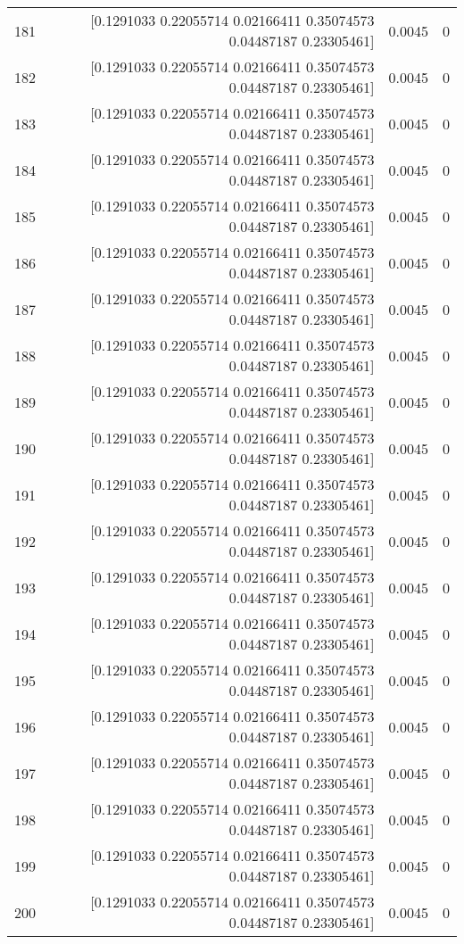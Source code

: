 \begin{longtable}{lrrr}
181 & [0.1291033  0.22055714 0.02166411 0.35074573 0.04487187 0.23305461] & 0.0045 & 0 \\
182 & [0.1291033  0.22055714 0.02166411 0.35074573 0.04487187 0.23305461] & 0.0045 & 0 \\
183 & [0.1291033  0.22055714 0.02166411 0.35074573 0.04487187 0.23305461] & 0.0045 & 0 \\
184 & [0.1291033  0.22055714 0.02166411 0.35074573 0.04487187 0.23305461] & 0.0045 & 0 \\
185 & [0.1291033  0.22055714 0.02166411 0.35074573 0.04487187 0.23305461] & 0.0045 & 0 \\
186 & [0.1291033  0.22055714 0.02166411 0.35074573 0.04487187 0.23305461] & 0.0045 & 0 \\
187 & [0.1291033  0.22055714 0.02166411 0.35074573 0.04487187 0.23305461] & 0.0045 & 0 \\
188 & [0.1291033  0.22055714 0.02166411 0.35074573 0.04487187 0.23305461] & 0.0045 & 0 \\
189 & [0.1291033  0.22055714 0.02166411 0.35074573 0.04487187 0.23305461] & 0.0045 & 0 \\
190 & [0.1291033  0.22055714 0.02166411 0.35074573 0.04487187 0.23305461] & 0.0045 & 0 \\
191 & [0.1291033  0.22055714 0.02166411 0.35074573 0.04487187 0.23305461] & 0.0045 & 0 \\
192 & [0.1291033  0.22055714 0.02166411 0.35074573 0.04487187 0.23305461] & 0.0045 & 0 \\
193 & [0.1291033  0.22055714 0.02166411 0.35074573 0.04487187 0.23305461] & 0.0045 & 0 \\
194 & [0.1291033  0.22055714 0.02166411 0.35074573 0.04487187 0.23305461] & 0.0045 & 0 \\
195 & [0.1291033  0.22055714 0.02166411 0.35074573 0.04487187 0.23305461] & 0.0045 & 0 \\
196 & [0.1291033  0.22055714 0.02166411 0.35074573 0.04487187 0.23305461] & 0.0045 & 0 \\
197 & [0.1291033  0.22055714 0.02166411 0.35074573 0.04487187 0.23305461] & 0.0045 & 0 \\
198 & [0.1291033  0.22055714 0.02166411 0.35074573 0.04487187 0.23305461] & 0.0045 & 0 \\
199 & [0.1291033  0.22055714 0.02166411 0.35074573 0.04487187 0.23305461] & 0.0045 & 0 \\
200 & [0.1291033  0.22055714 0.02166411 0.35074573 0.04487187 0.23305461] & 0.0045 & 0 \\

\end{longtable}

